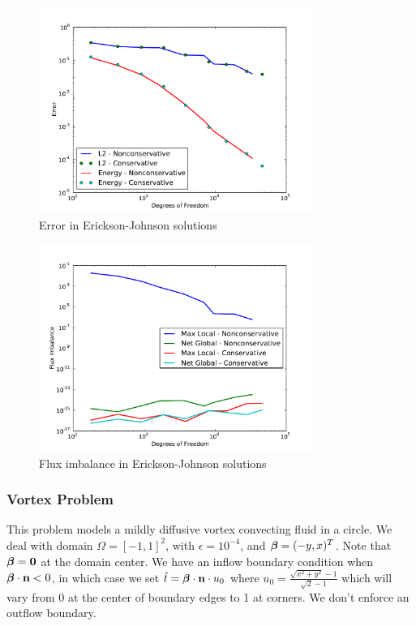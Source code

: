\documentclass[Proposal.tex]{subfiles}
\begin{document}
\begin{figure}[p]
\centering
\includegraphics[width=0.8\textwidth]{figs/Erickson/modifiedError.pdf}
\caption{Error in Erickson-Johnson solutions}
\label{fig:ericksonError}
\end{figure}

\begin{figure}[h!]
\centering
\includegraphics[width=0.8\textwidth]{figs/Erickson/modifiedFlux.pdf}
\caption{Flux imbalance in Erickson-Johnson solutions}
\label{ericksonFlux}
\end{figure}

\subsubsection{Vortex Problem}
This problem models a mildly diffusive vortex convecting fluid in a circle. We
deal with domain $\Omega=[-1,1]^2$, with $\epsilon=10^{-4}$, and
$\boldsymbol\beta=(-y,x)^T$. Note that $\boldsymbol\beta=\mathbf{0}$ at the domain center. We have an
inflow boundary condition when $\boldsymbol\beta\cdot\mathbf{n}<0$, in which case we set
$\hat t=\boldsymbol\beta\cdot\mathbf{n}\cdot u_0$ where
$u_0=\frac{\sqrt{x^2+y^2}-1}{\sqrt{2}-1}$ which will vary from 0 at the center
of boundary edges to 1 at corners. We don't enforce an outflow boundary.
\end{document}
